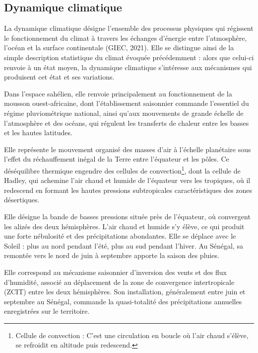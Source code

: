 \subsection{Dynamique climatique}

La dynamique climatique désigne l'ensemble des processus physiques qui régissent le fonctionnement du climat à travers les échanges d'énergie entre l'atmosphère, l'océan et la surface continentale (GIEC, 2021). Elle se distingue ainsi de la simple description statistique du climat évoquée précédemment : alors que celui-ci renvoie à un état moyen, la dynamique climatique s'intéresse aux mécanismes qui produisent cet état et ses variations.

Dans l'espace sahélien, elle renvoie principalement au fonctionnement de la mousson ouest-africaine, dont l'établissement saisonnier commande l'essentiel du régime pluviométrique national, ainsi qu'aux mouvements de grande échelle de l'atmosphère et des océans, qui régulent les transferts de chaleur entre les basses et les hautes latitudes.

Elle représente le mouvement organisé des masses d'air à l'échelle planétaire sous l'effet du réchauffement inégal de la Terre entre l'équateur et les pôles. Ce déséquilibre thermique engendre des cellules de convection\footnote{Cellule de convection : C'est une circulation en boucle où l’air chaud s’élève, se refroidit en altitude puis redescend.}, dont la cellule de Hadley, qui achemine l'air chaud et humide de l'équateur vers les tropiques, où il redescend en formant les hautes pressions subtropicales caractéristiques des zones désertiques.

Elle désigne la bande de basses pressions située près de l’équateur, où convergent les alizés des deux hémisphères. L’air chaud et humide s’y élève, ce qui produit une forte nébulosité et des précipitations abondantes. Elle se déplace avec le Soleil : plus au nord pendant l’été, plus au sud pendant l’hiver. Au Sénégal, sa remontée vers le nord de juin à septembre apporte la saison des pluies.

Elle correspond au mécanisme saisonnier d'inversion des vents et des flux d'humidité, associé au déplacement de la zone de convergence intertropicale (ZCIT) entre les deux hémisphères. Son installation, généralement entre juin et septembre au Sénégal, commande la quasi-totalité des précipitations annuelles enregistrées sur le territoire.

